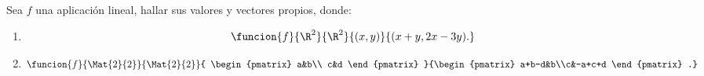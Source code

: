 \documentclass[10pt,a4]{examenEPN}
\begin{document}
\begin{preguntas}
\item Sea $f$ una aplicación lineal, hallar sus valores y vectores propios, donde:
\begin{enumerate}
    \item 
    \[
        \funcion{f}{\R^{2}}{\R^{2}}{(x,y)}{(x+y,2x-3y).}
    \]
    \item
    \[
        \funcion{f}{\Mat{2}{2}}{\Mat{2}{2}}{
        \begin{pmatrix}
        a&b\\
        c&d
        \end{pmatrix}
        }{\begin{pmatrix}
        a+b-d&b\\c&-a+c+d
        \end{pmatrix}
        .}
    \]
  
\end{enumerate}

\begin{respuesta}\hspace{0pt}


\end{respuesta}
\end{preguntas}
\end{document}

